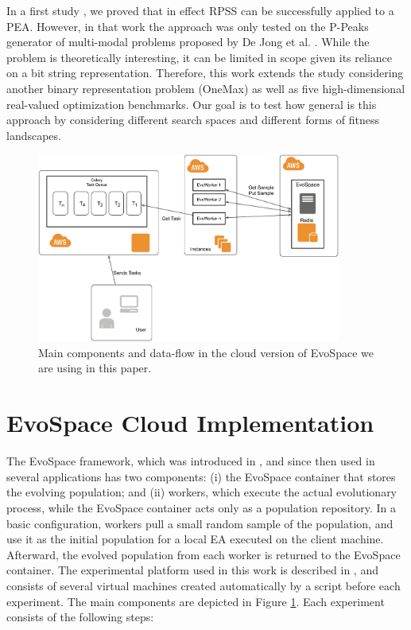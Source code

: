 \documentclass[conference]{IEEEtran}
\begin{document}
In a first study \cite{LNCS86720702}, we proved that in effect RPSS
can be successfully applied to a PEA. However, in that work the
approach was only tested on the P-Peaks generator of multi-modal problems proposed by De Jong et al. \cite{Jong:PS97}.
While the problem is theoretically interesting, it can be limited in scope given its reliance on a bit string representation.
Therefore, this work extends the study considering another binary representation problem (OneMax) as well as
five high-dimensional real-valued optimization benchmarks. Our goal is
to test how general is this approach by considering different search
spaces and different forms of fitness landscapes.

\begin{figure}[h!tbp]
    \centering
        \includegraphics[width=10cm]{img/EvoSpaceAWS.png}
    \caption{Main components and data-flow in the cloud version of EvoSpace we are using in this paper.}
    \label{fig:evospace}
  \end{figure}
%
\section{EvoSpace Cloud Implementation}
\label{sec:evo}

The EvoSpace framework, which was introduced in \cite{Evospace}, and
since then used in several applications \cite{GValdez2015} has two components: (i) the EvoSpace
container that stores the evolving population; and (ii) workers, which execute
the actual evolutionary process, while the EvoSpace container acts only as a population repository.
In a basic configuration, workers pull a small random sample of the
population, and use it as the initial population for a local EA executed
on the client machine. Afterward, the evolved population from each worker
is returned to the EvoSpace container. The experimental platform used in this work is
described in \cite{valenzuela2015implementing}, and consists of several virtual machines
created automatically by a script before each experiment. The main components are depicted
in Figure \ref{fig:evospace}. Each experiment consists of the following steps:
\end{document}
